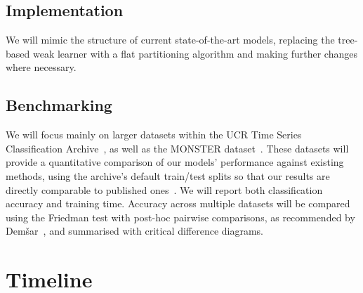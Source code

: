 \documentclass[a4paper, draft, 12pt]{article}
\begin{document}
\subsection{Implementation}

We will mimic the structure of current state-of-the-art models, replacing the
tree-based weak learner with a flat partitioning algorithm and making further
changes where necessary.

\subsection{Benchmarking}

We will focus mainly on larger datasets within the UCR Time Series
Classification Archive~\cite{dau2019ucr}, as well as the MONSTER
dataset~\cite{dempster2025monstermonashscalabletime}. These datasets will
provide a quantitative comparison of our models' performance against existing
methods, using the archive's default train/test splits so that our results are
directly comparable to published ones~\cite{middlehurst2024bakeoff}. We will
report both classification accuracy and training time. Accuracy across multiple
datasets will be compared using the Friedman test with post-hoc pairwise
comparisons, as recommended by Dem\v{s}ar~\cite{demsar2006statistical}, and
summarised with critical difference diagrams.

\section{Timeline}
\end{document}

